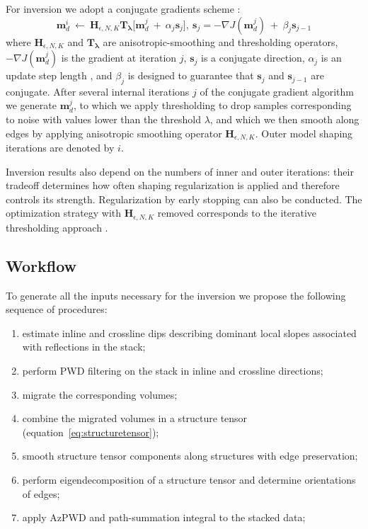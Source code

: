 For inversion we adopt a conjugate gradients scheme \cite[]{fomel07}:
\begin{equation}
\label{eq:itthr}
\mathbf{m}_d^i\ \leftarrow\ \mathbf{H}_{\epsilon,N,K} \mathbf{T_{\lambda}} \big[ \mathbf{m}_{d}^{j}\ +\ \alpha_{j}\mathbf{s}_{j} \big],\ \mathbf{s}_{j}=-\nabla J(\mathbf{m}_{d}^{j})\ +\ \beta_{j}\mathbf{s}_{j-1}
\end{equation}
where $\mathbf{H}_{\epsilon,N,K}$ and $\mathbf{T_{\lambda}}$ are anisotropic-smoothing and thresholding operators,
$-\nabla J(\mathbf{m}_{d}^{j})$ is the gradient at iteration $j$, $\mathbf{s}_{j}$ is a conjugate direction,
$\alpha_{j}$ is an update step length , and $\beta_j$ is designed
to guarantee that $\mathbf{s}_j$ and $\mathbf{s}_{j-1}$ are conjugate.
After several internal iterations $j$ of the conjugate
gradient algorithm we generate $\mathbf{m}_d^j$, to which
we apply thresholding to drop samples corresponding to noise with values lower than the threshold $\lambda$,
and which we then smooth along edges by applying anisotropic smoothing operator $\mathbf{H}_{\epsilon,N,K}$. Outer model shaping iterations
are denoted by $i$. 

Inversion results also depend on the numbers of inner and outer iterations:
their tradeoff determines how often shaping regularization is applied
and therefore controls its strength. Regularization by early stopping can also be conducted.
The optimization strategy with 
$\mathbf{H}_{\epsilon,N,K}$ removed corresponds to the iterative thresholding approach \cite[]{daubechies2004iterative}. 

\subsection{Workflow}

To generate all the inputs necessary for the inversion we propose the following sequence of procedures:
\begin{enumerate}
\item estimate inline and crossline dips describing dominant local slopes associated with reflections in the stack;
\item perform PWD filtering on the stack in inline and crossline directions;
\item migrate the corresponding volumes;
\item combine the migrated volumes in a structure tensor (equation~\ref{eq:structuretensor});
\item smooth structure tensor components along structures with edge preservation;
\item perform eigendecomposition of a structure tensor and determine orientations of edges;
\item apply AzPWD and path-summation integral to the stacked data;
\end{enumerate} 

